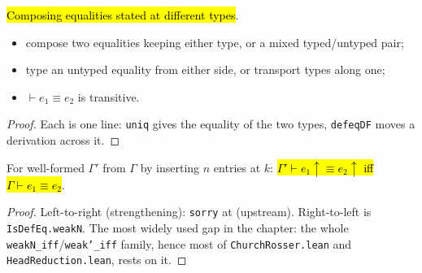 \begin{lemma}
\label{fam:defeq-mixing}
\leanok
{}

 \hl{Composing equalities stated at different types}.
\begin{itemize}
\item compose two equalities keeping either type, or a mixed typed/untyped pair;
\item type an untyped equality from either side, or transport types along one;
\item $\vdash e_1\equiv e_2$ is transitive.
\end{itemize}
\end{lemma}
\begin{proof}
\leanok
{} Each is one line: \texttt{uniq} gives the equality of the two types,
\texttt{defeqDF} moves a derivation across it.
\end{proof}

\begin{theorem}
\label{thm:isdefequ-weakn-iff}
\leanok
{}

 For well-formed $\Gamma'$ from $\Gamma$ by inserting $n$ entries at $k$:
\hl{$\Gamma'\vdash e_1{\uparrow}\equiv e_2{\uparrow}$ iff $\Gamma\vdash e_1\equiv e_2$}.
\end{theorem}
\begin{proof}
\stSorry{}  Left-to-right (strengthening): \texttt{sorry} at
 (upstream). Right-to-left is
\texttt{IsDefEq.weakN}.
 The most widely used gap in the chapter: the whole
\texttt{weakN\_iff}/\texttt{weak'\_iff} family, hence most of \texttt{ChurchRosser.lean} and
\texttt{HeadReduction.lean}, rests on it.
\end{proof}

